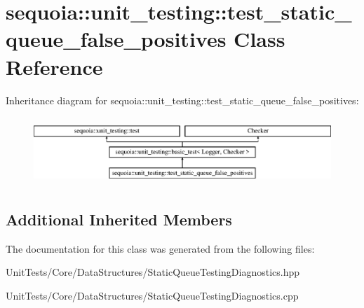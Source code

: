 \hypertarget{classsequoia_1_1unit__testing_1_1test__static__queue__false__positives}{}\section{sequoia\+::unit\+\_\+testing\+::test\+\_\+static\+\_\+queue\+\_\+false\+\_\+positives Class Reference}
\label{classsequoia_1_1unit__testing_1_1test__static__queue__false__positives}
Inheritance diagram for sequoia\+::unit\+\_\+testing\+::test\+\_\+static\+\_\+queue\+\_\+false\+\_\+positives\+:\begin{figure}[H]
\begin{center}
\leavevmode
\includegraphics[height=2.592592cm]{classsequoia_1_1unit__testing_1_1test__static__queue__false__positives}
\end{center}
\end{figure}
\subsection*{Additional Inherited Members}


The documentation for this class was generated from the following files\+:\begin{DoxyCompactItemize}
\item 
Unit\+Tests/\+Core/\+Data\+Structures/Static\+Queue\+Testing\+Diagnostics.\+hpp\item 
Unit\+Tests/\+Core/\+Data\+Structures/Static\+Queue\+Testing\+Diagnostics.\+cpp\end{DoxyCompactItemize}

